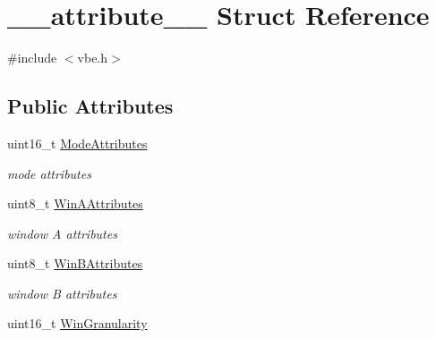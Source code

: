 \hypertarget{struct____attribute____}{}\section{\+\_\+\+\_\+attribute\+\_\+\+\_\+ Struct Reference}
\label{struct____attribute____}


{\ttfamily \#include $<$vbe.\+h$>$}

\subsection*{Public Attributes}
\begin{DoxyCompactItemize}
\item 
uint16\+\_\+t \hyperlink{struct____attribute_____a68ea99ad36679e583fa9674016e30903}{Mode\+Attributes}\hypertarget{struct____attribute_____a68ea99ad36679e583fa9674016e30903}{}\label{struct____attribute_____a68ea99ad36679e583fa9674016e30903}

\begin{DoxyCompactList}\small\item\em mode attributes \end{DoxyCompactList}\item 
uint8\+\_\+t \hyperlink{struct____attribute_____aeffe4dec59c5a757f65a97a66c812d3b}{Win\+A\+Attributes}\hypertarget{struct____attribute_____aeffe4dec59c5a757f65a97a66c812d3b}{}\label{struct____attribute_____aeffe4dec59c5a757f65a97a66c812d3b}

\begin{DoxyCompactList}\small\item\em window A attributes \end{DoxyCompactList}\item 
uint8\+\_\+t \hyperlink{struct____attribute_____ac9e21a3d7d22b24ed82be39f790b1408}{Win\+B\+Attributes}\hypertarget{struct____attribute_____ac9e21a3d7d22b24ed82be39f790b1408}{}\label{struct____attribute_____ac9e21a3d7d22b24ed82be39f790b1408}

\begin{DoxyCompactList}\small\item\em window B attributes \end{DoxyCompactList}\item 
uint16\+\_\+t \hyperlink{struct____attribute_____acc2114dbf039909e55cc3966abd3358d}{Win\+Granularity}\hypertarget{struct____attribute_____acc2114dbf039909e55cc3966abd3358d}{}\label{struct____attribute_____acc2114dbf039909e55cc3966abd3358d}


\end{DoxyCompactItemize}
